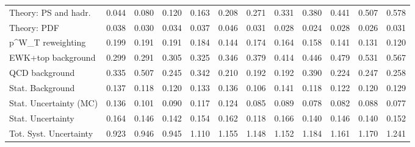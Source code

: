 \begin{tabular}{l|p{0.6cm}p{0.6cm}p{0.6cm}p{0.6cm}p{0.6cm}p{0.6cm}p{0.6cm}p{0.6cm}p{0.6cm}p{0.6cm}p{0.6cm}}
Theory: PS and hadr.                     & 0.044 & 0.080 & 0.120 & 0.163 & 0.208 & 0.271 & 0.331 & 0.380 & 0.441 & 0.507 & 0.578 \\
Theory: PDF                              & 0.038 & 0.030 & 0.034 & 0.037 & 0.046 & 0.031 & 0.028 & 0.024 & 0.028 & 0.026 & 0.031 \\
p^{W}_{T} reweighting                    & 0.199 & 0.191 & 0.191 & 0.184 & 0.144 & 0.174 & 0.164 & 0.158 & 0.141 & 0.131 & 0.120 \\
EWK+top background                       & 0.299 & 0.291 & 0.305 & 0.325 & 0.346 & 0.379 & 0.414 & 0.446 & 0.479 & 0.531 & 0.567 \\
QCD background                           & 0.335 & 0.507 & 0.245 & 0.342 & 0.210 & 0.192 & 0.192 & 0.390 & 0.224 & 0.247 & 0.258 \\
Stat. Background                         & 0.137 & 0.118 & 0.120 & 0.133 & 0.136 & 0.106 & 0.141 & 0.118 & 0.122 & 0.120 & 0.129 \\
Stat. Uncertainty (MC)                   & 0.136 & 0.101 & 0.090 & 0.117 & 0.124 & 0.085 & 0.089 & 0.078 & 0.082 & 0.088 & 0.077 \\
\hline
Stat. Uncertainty                        & 0.164 & 0.146 & 0.142 & 0.154 & 0.162 & 0.118 & 0.166 & 0.140 & 0.146 & 0.140 & 0.152 \\
\hline
Tot. Syst. Uncertainty                   & 0.923 & 0.946 & 0.945 & 1.110 & 1.155 & 1.148 & 1.152 & 1.184 & 1.161 & 1.170 & 1.241 \\
\hline
\end{tabular}
